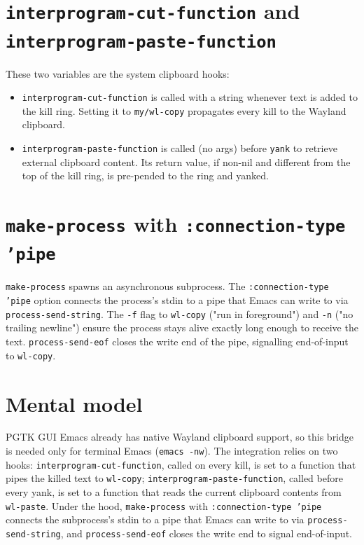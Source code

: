 \section{\texttt{interprogram-cut-function} and \texttt{interprogram-paste-function}}\label{interprogram-cut-function-and-interprogram-paste-function}

These two variables are the system clipboard hooks:

\begin{itemize}
\item \texttt{interprogram-cut-function} is called with a string whenever text is added to the kill ring. Setting it to \texttt{my/wl-copy} propagates every kill to the Wayland clipboard.
\item \texttt{interprogram-paste-function} is called (no args) before \texttt{yank} to retrieve external clipboard content. Its return value, if non-nil and different from the top of the kill ring, is pre-pended to the ring and yanked.
\end{itemize}

\section{\texttt{make-process} with \texttt{:connection-type 'pipe}}\label{make-process-with-connection-type-pipe}

\texttt{make-process} spawns an asynchronous subprocess. The \texttt{:connection-type 'pipe} option connects the process's stdin to a pipe that Emacs can write to via \texttt{process-send-string}. The \texttt{-f} flag to \texttt{wl-copy} ("run in foreground") and \texttt{-n} ("no trailing newline") ensure the process stays alive exactly long enough to receive the text. \texttt{process-send-eof} closes the write end of the pipe, signalling end-of-input to \texttt{wl-copy}.

\section{Mental model}
PGTK GUI Emacs already has native Wayland clipboard support, so this bridge
is needed only for terminal Emacs (\texttt{emacs -nw}).  The integration
relies on two hooks: \texttt{interprogram-cut-function}, called on every
kill, is set to a function that pipes the killed text to \texttt{wl-copy};
\texttt{interprogram-paste-function}, called before every yank, is set to a
function that reads the current clipboard contents from \texttt{wl-paste}.
Under the hood, \texttt{make-process} with \texttt{:connection-type 'pipe}
connects the subprocess's stdin to a pipe that Emacs can write to via
\texttt{process-send-string}, and \texttt{process-send-eof} closes the write
end to signal end-of-input.
